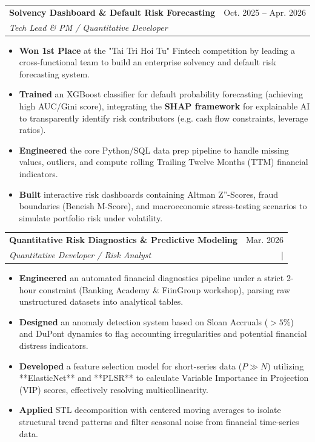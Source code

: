 \documentclass[letterpaper,11pt]{article}
\makeatletter
\newcommand{\myuline}[1]{%
  \uline{\phantom{#1}}%
  \llap{\contour{white}{#1}}%
}
\newcommand{\resumeItem}[1]{
  \item\small{
    {#1 \vspace{-1pt}}
  }
}
\newcommand{\resumeSubheading}[4]{
  \vspace{-1pt}\item
    \begin{tabular*}{\textwidth}[t]{l@{\extracolsep{\fill}}r}
      \textbf{#1} & {\color{dark-grey}\small #2}\vspace{1pt}\\ %
      \textit{#3} & {\color{dark-grey} \small #4}\\ %
    \end{tabular*}\vspace{-4pt}
}
\newcommand{\resumeItemListStart}{\begin{itemize}}
\newcommand{\resumeItemListEnd}{\end{itemize}\vspace{0pt}}
\makeatother
\begin{document}
      \resumeSubheading
        {Solvency Dashboard \& Default Risk Forecasting}{Oct. 2025 -- Apr. 2026}
        {Tech Lead \& PM / Quantitative Developer}{\href{https://github.com/wane-bs/Tai_lanh_-_Talent}{\myuline{Github}}}
        \resumeItemListStart
          \resumeItem{\textbf{Won 1st Place} at the "Tai Tri Hoi Tu" Fintech competition by leading a cross-functional team to build an enterprise solvency and default risk forecasting system.}
          \resumeItem{\textbf{Trained} an XGBoost classifier for default probability forecasting (achieving high AUC/Gini score), integrating the \textbf{SHAP framework} for explainable AI to transparently identify risk contributors (e.g. cash flow constraints, leverage ratios).}
          \resumeItem{\textbf{Engineered} the core Python/SQL data prep pipeline to handle missing values, outliers, and compute rolling Trailing Twelve Months (TTM) financial indicators.}
          \resumeItem{\textbf{Built} interactive risk dashboards containing Altman Z''-Scores, fraud boundaries (Beneish M-Score), and macroeconomic stress-testing scenarios to simulate portfolio risk under volatility.}
        \resumeItemListEnd

      \resumeSubheading
        {Quantitative Risk Diagnostics \& Predictive Modeling}{Mar. 2026}
        {Quantitative Developer / Risk Analyst}{\href{https://github.com/wane-bs/fiinpro_tt}{\myuline{GitHub}} $|$ \href{https://wane-bs.github.io/fiinpro_tt/}{\myuline{Dashboard}}}
        \resumeItemListStart
          \resumeItem{\textbf{Engineered} an automated financial diagnostics pipeline under a strict 2-hour constraint (Banking Academy \& FiinGroup workshop), parsing raw unstructured datasets into analytical tables.}
          \resumeItem{\textbf{Designed} an anomaly detection system based on Sloan Accruals ($>5\%$) and DuPont dynamics to flag accounting irregularities and potential financial distress indicators.}
          \resumeItem{\textbf{Developed} a feature selection model for short-series data ($P \gg N$) utilizing **ElasticNet** and **PLSR** to calculate Variable Importance in Projection (VIP) scores, effectively resolving multicollinearity.}
          \resumeItem{\textbf{Applied} STL decomposition with centered moving averages to isolate structural trend patterns and filter seasonal noise from financial time-series data.}
        \resumeItemListEnd
\end{document}
